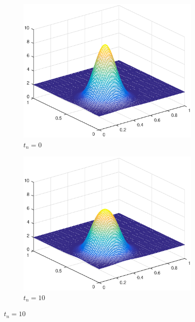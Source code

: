 \begin{figure}[h!]
    \centering
    \begin{subfigure}[t]{0.4\textwidth}
        \centering
        \includegraphics[width=\textwidth]{images/sol_ds_0000_per.eps}
        \caption{$t_{n}=0$}
        \label{fig:0}
    \end{subfigure}
    \begin{subfigure}[t]{0.48\textwidth}
        \centering
        \includegraphics[width=\textwidth]{images/sol_ds_0010_per.eps}
        \caption{$t_{n}=10$}
        \label{fig:10}
    \end{subfigure}

\end{figure}
